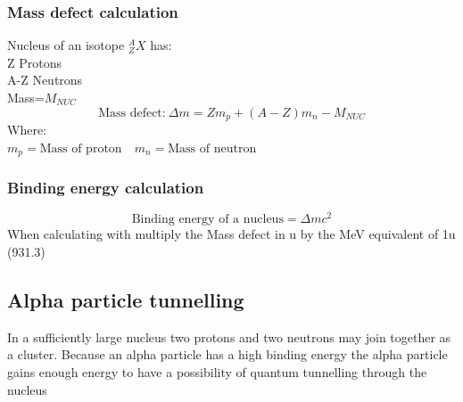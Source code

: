 \documentclass{article}[18pt]
\begin{document}
\subsubsection{Mass defect calculation}
Nucleus of an isotope $^A_ZX$ has:\\
Z Protons\\
A-Z Neutrons\\
Mass=$M_{NUC}$
$$\textrm{Mass defect:} \ \Delta m=Zm_p+(A-Z)m_n-M_{NUC}$$
Where:\\
$m_p=\textrm{Mass of proton} \quad m_n=\textrm{Mass of neutron}$
\subsubsection{Binding energy calculation}
$$\textrm{Binding energy of a nucleus}=\Delta mc^2$$
When calculating with multiply the Mass defect in u by the MeV equivalent of 1u (931.3)
\subsection{Alpha particle tunnelling}
In a sufficiently large nucleus two protons and two neutrons may join together as a cluster. Because an alpha particle has a high binding energy the alpha particle gains enough energy to have a possibility of quantum tunnelling through the nucleus
\end{document}
